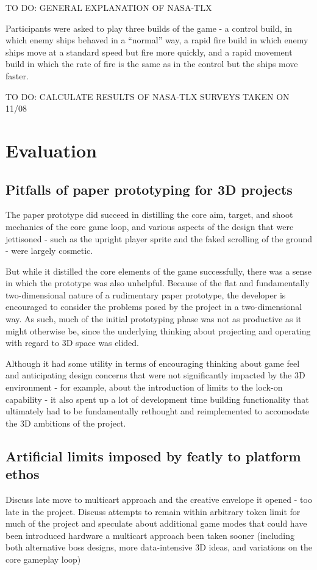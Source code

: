 \documentclass[11pt]{article}
\begin{document}
TO DO: GENERAL EXPLANATION OF NASA-TLX

Participants were asked to play three builds of the game - a control build, in which enemy
ships behaved in a ``normal'' way, a rapid fire build in which enemy ships move at a standard
speed but fire more quickly, and a rapid movement build in which the rate of fire is the same
as in the control but the ships move faster.

TO DO: CALCULATE RESULTS OF NASA-TLX SURVEYS TAKEN ON 11/08


\section{Evaluation}

\subsection{Pitfalls of paper prototyping for 3D projects}\label{prototypepitfalls}

The paper prototype did succeed in distilling the core aim, target, and shoot mechanics
of the core game loop, and various aspects of the design that were jettisoned - such as
the upright player sprite and the faked scrolling of the ground - were largely cosmetic.

But while it distilled the core elements of the game successfully, there was a sense in
which the prototype was also unhelpful. Because of the flat and fundamentally two-dimensional
nature of a rudimentary paper prototype, the developer is encouraged to consider the
problems posed by the project in a two-dimensional way. As such, much of the initial prototyping
phase was not as productive as it might otherwise be, since the underlying thinking about
projecting and operating with regard to 3D space was elided.

Although it had some utility in terms of encouraging thinking about game feel and anticipating
design concerns that were not significantly impacted by the 3D environment - for example, about
the introduction of limits to the lock-on capability - it also spent up a lot of development time
building functionality that ultimately had to be fundamentally rethought and reimplemented to
accomodate the 3D ambitions of the project.

\subsection{Artificial limits imposed by featly to platform ethos}
Discuss late move to multicart approach and the creative envelope it opened - too late
in the project. Discuss attempts to remain within arbitrary token limit for much of the
project and speculate about additional game modes that could have been introduced hardware
a multicart approach been taken sooner (including both alternative boss designs, more
data-intensive 3D ideas, and variations on the core gameplay loop)
\end{document}
